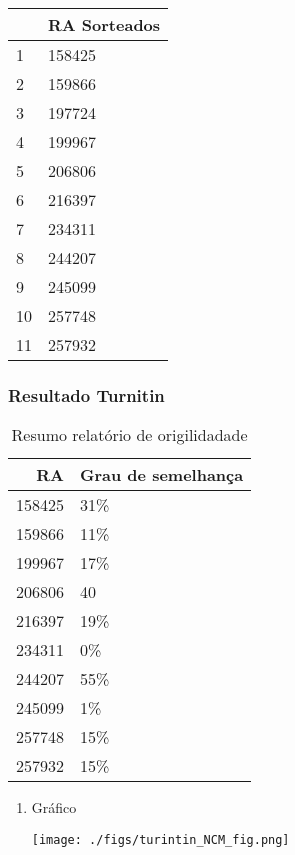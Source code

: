 \documentclass[11pt]{article}
\begin{document}
\begin{tabular}{ll}
\toprule
{} & RA Sorteados \\
\midrule
1  &       158425 \\
2  &       159866 \\
3  &       197724 \\
4  &       199967 \\
5  &       206806 \\
6  &       216397 \\
7  &       234311 \\
8  &       244207 \\
9  &       245099 \\
10 &       257748 \\
11 &       257932 \\
\bottomrule
\end{tabular}


\subsubsection{Resultado Turnitin}
\label{sec:org27e35f0}

\begin{table}[htbp]
\caption{\label{TurnitinNCM}Resumo relatório de origilidadade}
\centering
\begin{tabular}{rl}
\hline
RA & Grau de semelhança\\
\hline
158425 & 31\%\\
159866 & 11\%\\
199967 & 17\%\\
206806 & 40\\
216397 & 19\%\\
234311 & 0\%\\
244207 & 55\%\\
245099 & 1\%\\
257748 & 15\%\\
257932 & 15\%\\
\hline
\end{tabular}
\end{table}
\begin{enumerate}
\item Gráfico
\label{sec:org799f88d}
\begin{center}
\texttt{[image: ./figs/turintin\_NCM\_fig.png]}
\end{center}
\end{enumerate}
\end{document}
